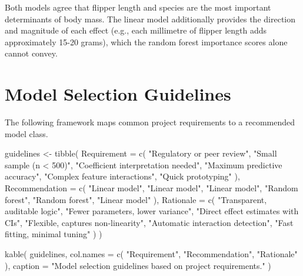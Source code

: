 \documentclass[
  letterpaper,
  DIV=11,
  numbers=noendperiod]{scrartcl}
\newenvironment{Shaded}{\begin{snugshade}}{\end{snugshade}}
\newcommand{\AttributeTok}[1]{\textcolor[rgb]{0.40,0.45,0.13}{#1}}
\newcommand{\FunctionTok}[1]{\textcolor[rgb]{0.28,0.35,0.67}{#1}}
\newcommand{\NormalTok}[1]{\textcolor[rgb]{0.00,0.23,0.31}{#1}}
\newcommand{\OtherTok}[1]{\textcolor[rgb]{0.00,0.23,0.31}{#1}}
\newcommand{\StringTok}[1]{\textcolor[rgb]{0.13,0.47,0.30}{#1}}
\begin{document}
Both models agree that flipper length and species are the most important
determinants of body mass. The linear model additionally provides the
direction and magnitude of each effect (e.g., each millimetre of flipper
length adds approximately 15-20 grams), which the random forest
importance scores alone cannot convey.

\section{Model Selection Guidelines}\label{model-selection-guidelines}

The following framework maps common project requirements to a
recommended model class.

\begin{Shaded}
\begin{Highlighting}[]
\NormalTok{guidelines }\OtherTok{\textless{}{-}} \FunctionTok{tibble}\NormalTok{(}
  \AttributeTok{Requirement =} \FunctionTok{c}\NormalTok{(}
    \StringTok{"Regulatory or peer review"}\NormalTok{,}
    \StringTok{"Small sample (n \textless{} 500)"}\NormalTok{,}
    \StringTok{"Coefficient interpretation needed"}\NormalTok{,}
    \StringTok{"Maximum predictive accuracy"}\NormalTok{,}
    \StringTok{"Complex feature interactions"}\NormalTok{,}
    \StringTok{"Quick prototyping"}
\NormalTok{  ),}
  \AttributeTok{Recommendation =} \FunctionTok{c}\NormalTok{(}
    \StringTok{"Linear model"}\NormalTok{,}
    \StringTok{"Linear model"}\NormalTok{,}
    \StringTok{"Linear model"}\NormalTok{,}
    \StringTok{"Random forest"}\NormalTok{,}
    \StringTok{"Random forest"}\NormalTok{,}
    \StringTok{"Linear model"}
\NormalTok{  ),}
  \AttributeTok{Rationale =} \FunctionTok{c}\NormalTok{(}
    \StringTok{"Transparent, auditable logic"}\NormalTok{,}
    \StringTok{"Fewer parameters, lower variance"}\NormalTok{,}
    \StringTok{"Direct effect estimates with CIs"}\NormalTok{,}
    \StringTok{"Flexible, captures non{-}linearity"}\NormalTok{,}
    \StringTok{"Automatic interaction detection"}\NormalTok{,}
    \StringTok{"Fast fitting, minimal tuning"}
\NormalTok{  )}
\NormalTok{)}

\FunctionTok{kable}\NormalTok{(}
\NormalTok{  guidelines,}
  \AttributeTok{col.names =} \FunctionTok{c}\NormalTok{(}
    \StringTok{"Requirement"}\NormalTok{, }\StringTok{"Recommendation"}\NormalTok{,}
    \StringTok{"Rationale"}
\NormalTok{  ),}
  \AttributeTok{caption =} \StringTok{"Model selection guidelines based on}
\StringTok{    project requirements."}
\NormalTok{)}
\end{Highlighting}
\end{Shaded}
\end{document}
